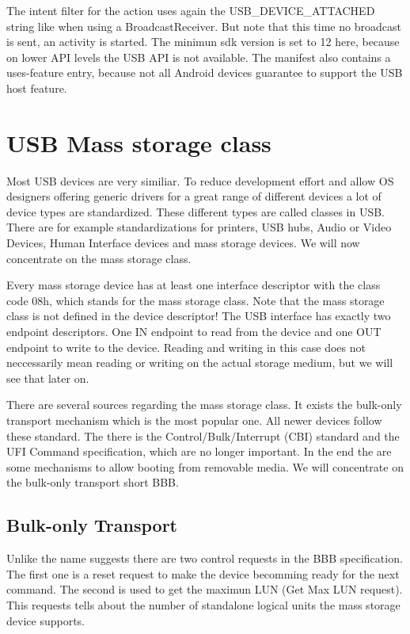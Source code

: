 The intent filter for the action uses again the USB\_DEVICE\_ATTACHED string like when using a BroadcastReceiver. But note that this time no broadcast is sent, an activity is started. The minimun sdk version is set to 12 here, because on lower API levels the USB API is not available. The manifest also contains a uses-feature entry, because not all Android devices guarantee to support the USB host feature\cite{android_usb_host}.

\chapter{USB Mass storage class}

Most USB devices are very similiar. To reduce development effort and allow OS designers offering generic drivers for a great range of different devices a lot of device types are standardized. These different types are called classes in USB. There are for example standardizations for printers, USB hubs, Audio or Video Devices, Human Interface devices and mass storage devices. We will now concentrate on the mass storage class.

Every mass storage device has at least one interface descriptor with the class code 08h, which stands for the mass storage class. Note that the mass storage class is not defined in the device descriptor! The USB interface has exactly two endpoint descriptors. One IN endpoint to read from the device and one OUT endpoint to write to the device. Reading and writing in this case does not neccessarily mean reading or writing on the actual storage medium, but we will see that later on.

There are several sources regarding the mass storage class. It exists the bulk-only transport mechanism which is the most popular one. All newer devices follow these standard. The there is the Control/Bulk/Interrupt (CBI) standard and the UFI Command specification, which are no longer important. In the end the are some mechanisms to allow booting from removable media. We will concentrate on the bulk-only transport short BBB.

\section{Bulk-only Transport}

Unlike the name suggests there are two control requests in the BBB specification. The first one is a reset request to make the device becomming ready for the next command. The second is used to get the maximun LUN (Get Max LUN request). This requests tells about the number of standalone logical units the mass storage device supports.

